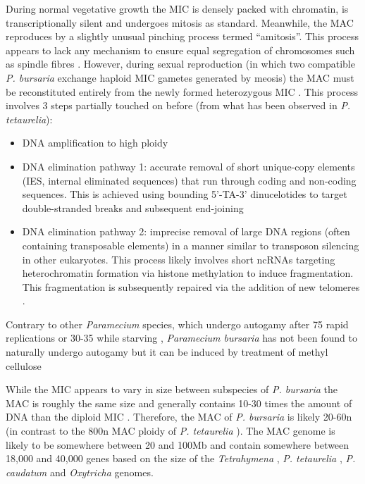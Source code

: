 During normal vegetative growth the MIC is densely packed with chromatin, is transcriptionally silent and undergoes
mitosis as standard.  Meanwhile, the MAC reproduces by a slightly unusual pinching process termed ``amitosis''.  This process
appears to lack any mechanism to ensure equal segregation of chromosomes such as spindle fibres \citep{Kiefer2013}.
However, during sexual reproduction (in which two compatible \textit{P. bursaria} exchange haploid MIC gametes generated by meosis) the MAC
must be reconstituted entirely from the newly formed heterozygous MIC \citep{Jahn2002}.
This process involves 3 steps partially touched on before (from what has been observed in \textit{P. tetaurelia}):
\begin{itemize}
    \item DNA amplification to high ploidy
    \item DNA elimination pathway 1: accurate removal of short unique-copy elements (IES, internal eliminated sequences) that run through coding and non-coding sequences. This is achieved using bounding 5'-TA-3' dinucelotides to target double-stranded breaks and subsequent end-joining
    \item DNA elimination pathway 2: imprecise removal of large DNA regions (often containing transposable elements) in a manner similar
        to transposon silencing in other eukaryotes.  This process likely involves short ncRNAs targeting heterochromatin formation via histone methylation to induce fragmentation.  This fragmentation is subsequently repaired via the addition of new telomeres \citep{Duret2008}.
\end{itemize}
Contrary to other \textit{Paramecium} species, which undergo autogamy after 75 rapid replications \citep{Sung2012} or 30-35 while starving
\citep{Berger1986}, \textit{Paramecium bursaria} has not been found to 
naturally undergo autogamy \citep{Siegel1963,Yanagi2004} but it can be induced by treatment of methyl cellulose \citep{Yanagi2004}

While the MIC appears to vary in size between subspecies of \textit{P. bursaria} the MAC is roughly the same
size and generally contains 10-30 times the amount of DNA than the diploid MIC \citep{Cullis1972}.  
Therefore, the MAC of \textit{P. bursaria} is likely 20-60n (in contrast to the 800n MAC ploidy of \textit{P. tetaurelia} \citep{Duret2008}).
The MAC genome is likely to be somewhere between 20 and 100Mb and contain somewhere between 
18,000 and 40,000 genes based on the size of the \textit{Tetrahymena} \citep{Eisen2006}, \textit{P. tetaurelia} \citep{Aury2006}, \textit{P. caudatum} \citep{McGrath2014} and \textit{Oxytricha} \citep{Swart2013} genomes.

